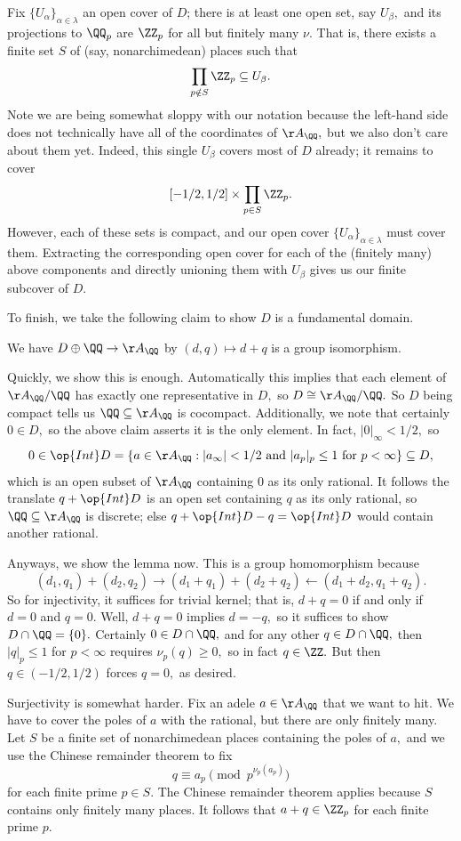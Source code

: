 Fix $\{U_\alpha\}_{\alpha\in\lambda}$ an open cover of $D$; there is at least one open set, say $U_\beta,$ and its projections to $\QQ_p$ are $\ZZ_p$ for all but finitely many $\nu.$ That is, there exists a finite set $S$ of (say, nonarchimedean) places such that
\[\prod_{p\notin S}\ZZ_p\subseteq U_\beta.\]
Note we are being somewhat sloppy with our notation because the left-hand side does not technically have all of the coordinates of $\AA_\QQ,$ but we also don't care about them yet. Indeed, this single $U_\beta$ covers most of $D$ already; it remains to cover
\[[-1/2,1/2]\times\prod_{p\in S}\ZZ_p.\]
However, each of these sets is compact, and our open cover $\{U_\alpha\}_{\alpha\in\lambda}$ must cover them. Extracting the corresponding open cover for each of the (finitely many) above components and directly unioning them with $U_\beta$ gives us our finite subcover of $D.$

To finish, we take the following claim to show $D$ is a fundamental domain.
\begin{lemma}
    We have $D\oplus\QQ\to\AA_\QQ$ by $(d,q)\mapsto d+q$ is a group isomorphism.
\end{lemma}
Quickly, we show this is enough. Automatically this implies that each element of $\AA_\QQ/\QQ$ has exactly one representative in $D,$ so $D\cong\AA_\QQ/\QQ.$ So $D$ being compact tells us $\QQ\subseteq\AA_\QQ$ is cocompact. Additionally, we note that certainly $0\in D,$ so the above claim asserts it is the only element. In fact, $|0|_\infty<1/2,$ so
\[0\in\op{Int}D=\{a\in\AA_\QQ:|a_\infty|<1/2\text{ and }|a_p|_p\le1\text{ for }p<\infty\}\subseteq D,\]
which is an open subset of $\AA_\QQ$ containing $0$ as its only rational. It follows the translate $q+\op{Int}D$ is an open set containing $q$ as its only rational, so $\QQ\subseteq\AA_\QQ$ is discrete; else $q+\op{Int}D-q=\op{Int}D$ would contain another rational.

Anyways, we show the lemma now. This is a group homomorphism because
\[(d_1,q_1)+(d_2,q_2)\to(d_1+q_1)+(d_2+q_2)\leftarrow(d_1+d_2,q_1+q_2).\]
So for injectivity, it suffices for trivial kernel; that is, $d+q=0$ if and only if $d=0$ and $q=0.$ Well, $d+q=0$ implies $d=-q,$ so it suffices to show $D\cap\QQ=\{0\}.$ Certainly $0\in D\cap\QQ,$ and for any other $q\in D\cap\QQ,$ then $|q|_p\le1$ for $p<\infty$ requires $\nu_p(q)\ge0,$ so in fact $q\in\ZZ.$ But then $q\in(-1/2,1/2)$ forces $q=0,$ as desired.

Surjectivity is somewhat harder. Fix an adele $a\in\AA_\QQ$ that we want to hit. We have to cover the poles of $a$ with the rational, but there are only finitely many. Let $S$ be a finite set of nonarchimedean places containing the poles of $a,$ and we use the Chinese remainder theorem to fix
\[q\equiv a_p\pmod{p^{\nu_p(a_p)}}\]
for each finite prime $p\in S.$ The Chinese remainder theorem applies because $S$ contains only finitely many places. It follows that $a+q\in\ZZ_p$ for each finite prime $p.$

